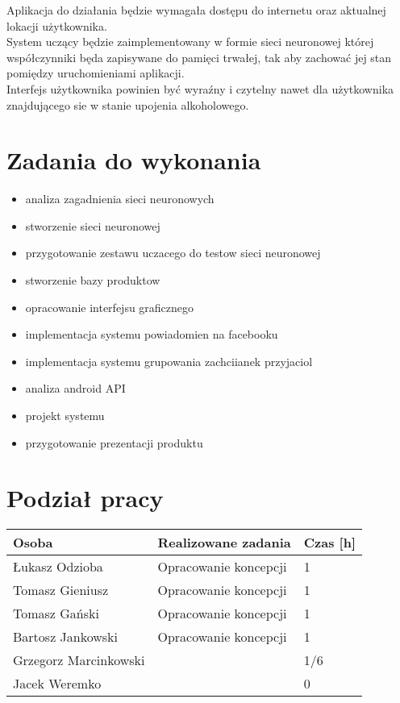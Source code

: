 \documentclass[a4paper,twoside,11pt]{article}
\begin{document}
Aplikacja do działania będzie wymagała dostępu do internetu oraz aktualnej lokacji użytkownika. \\

System uczący będzie zaimplementowany w formie sieci neuronowej której współczynniki będa zapisywane do pamięci trwałej, tak aby zachować jej stan pomiędzy uruchomieniami aplikacji. \\


Interfejs użytkownika powinien być wyraźny i czytelny nawet dla użytkownika znajdującego sie w stanie upojenia alkoholowego.

\section{Zadania do wykonania}
\begin{itemize}
\item analiza zagadnienia sieci neuronowych
\item stworzenie sieci neuronowej
\item przygotowanie zestawu uczacego do testow sieci neuronowej
\item stworzenie bazy produktow
\item opracowanie interfejsu graficznego
\item implementacja systemu powiadomien na facebooku
\item implementacja systemu grupowania zachciianek przyjaciol
\item analiza android API
\item projekt systemu
\item przygotowanie prezentacji produktu
\end{itemize}

\section{Podział pracy}
\begin{center}
\begin{tabular}{|l|p{11cm}|l|}
  \hline 
  Osoba & Realizowane zadania & Czas [h]\\
  \hline
  Łukasz Odzioba & Opracowanie koncepcji & 1 \\
 \hline
  Tomasz Gieniusz & Opracowanie koncepcji & 1 \\
 \hline
  Tomasz Gański & Opracowanie koncepcji & 1 \\
 \hline 
  Bartosz Jankowski & Opracowanie koncepcji & 1 \\
 \hline
  Grzegorz Marcinkowski &  & 1/6 \\
 \hline
  Jacek Weremko &  & 0 \\
 \hline
\end{tabular} 
\end{center}
\end{document}
